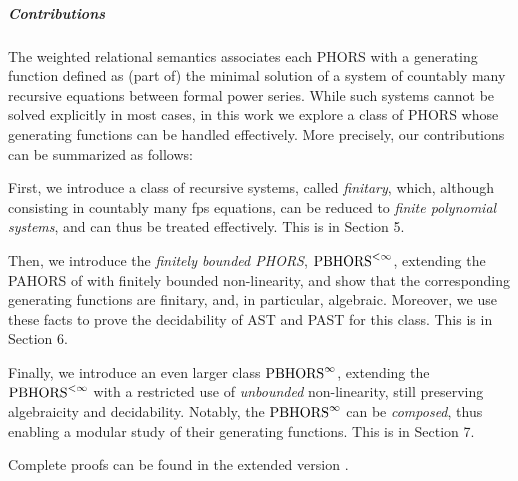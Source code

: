 \subparagraph*{Contributions}
The weighted relational semantics associates each PHORS with a generating function defined as (part of) the minimal solution of a system of countably many recursive equations between formal power series. While such systems cannot be solved explicitly in most cases, 
in this work we explore a class of PHORS whose generating functions can be handled effectively.
More precisely, our contributions can be summarized as follows:
\begin{varitemize}

\item First, we introduce a class of recursive systems, called \emph{finitary}, which, although consisting in countably many fps equations, can be reduced to \emph{finite polynomial systems}, and can thus be treated effectively. This is in Section 5.


\item Then, we introduce the \emph{finitely bounded PHORS}, $\text{PBHORS}^{<\infty}$, extending the PAHORS of \cite{DBLP:conf/lics/LiMO22} with finitely bounded non-linearity, and show that the corresponding generating functions are finitary, and, in particular, algebraic. Moreover, we use these facts to prove the decidability of AST and PAST for this class.
This is in Section 6.

\item Finally, we introduce an even larger class $\text{PBHORS}^{\infty}$, extending the $\text{PBHORS}^{<\infty}$ with a restricted use of \emph{unbounded} non-linearity, still preserving algebraicity and decidability. Notably, the $\text{PBHORS}^{\infty}$ can be \emph{composed}, thus enabling a modular study of their generating functions. This is in Section 7.


\end{varitemize}
Complete proofs can be found in the extended version \cite{ext_version}.
